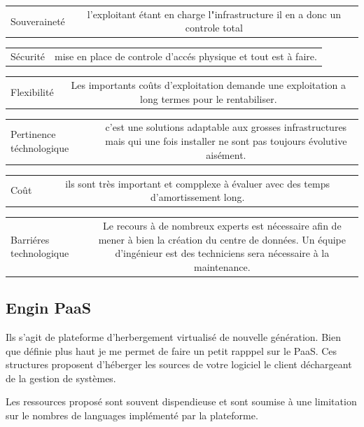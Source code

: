 \documentclass[11pt, a4paper ]{article}
\begin{document}
\begin{spacing}{1.5}
\begin{center}
	\begin{tabular}{| l | c | }
		Souveraineté &  l'exploitant étant en charge l"infrastructure il en a donc un controle total \\ 
	\end{tabular}
	\begin{tabular}{| l | c | }
		Sécurité & mise en place de controle d'accés physique et tout est à faire. \\
	\end{tabular}
	\begin{tabular}{| l | c | }
		Flexibilité & Les importants coûts d'exploitation demande une exploitation a long termes pour le rentabiliser.  \\
	\end{tabular}
	\begin{tabular}{| l | c | }
		Pertinence téchnologique & c'est une solutions adaptable aux grosses infrastructures mais qui une fois installer ne sont pas toujours évolutive aisément. \\
	\end{tabular}
	\begin{tabular}{| l | c | }
		Coût & ils sont très important et compplexe à évaluer avec des temps d'amortissement long.\\
	\end{tabular}
	\begin{tabular}{| l | c | }
		Barriéres technologique & Le recours à de nombreux experts est nécessaire afin de mener à bien la création du centre de données. Un équipe d'ingénieur est des techniciens sera nécessaire à la maintenance. \\
	\end{tabular}
\end{center}

			\subsection{Engin PaaS}

Ils s'agit de plateforme d'herbergement virtualisé de nouvelle génération.  Bien que définie plus haut je me permet de faire un petit rapppel sur le PaaS. Ces structures proposent d'héberger les sources de votre logiciel le client déchargeant de la gestion de systèmes.

Les ressources proposé sont souvent dispendieuse et sont soumise à une limitation sur le nombres de languages implémenté par la plateforme.


\end{spacing}
\end{document}
